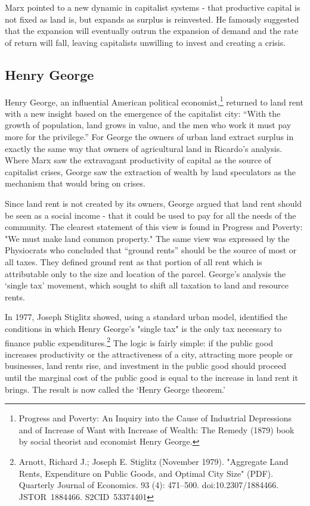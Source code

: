 Marx pointed to a new dynamic in capitalist systems - that productive capital is not fixed as land is, but  expands as surplus is reinvested. He famously suggested that the expansion will eventually outrun the expansion of demand and the rate of return will fall, leaving capitalists unwilling to invest and creating a crisis. 


 
\subsection{Henry George} 
  Henry George, an influential American political economist,\footnote{Progress and Poverty: An Inquiry into the Cause of Industrial Depressions and of Increase of Want with Increase of Wealth: The Remedy (1879) book by social theorist and economist Henry George.}  returned to land rent with a new insight based on the emergence of the capitalist city: ``With the growth of population, land grows in value, and the men who work it must pay more for the privilege.'' For George the owners of urban land extract surplus in exactly the same way that owners of agricultural land in Ricardo's analysis. Where Marx saw  the extravagant productivity of capital  as the source of capitalist crises, George saw the extraction of wealth by land speculators as the mechanism that would bring on crises.
  
  Since land rent is not created by its owners, George argued that land rent should be seen as a social income - that it could be used to pay for all the needs of the community. The clearest statement of this view is found in Progress and Poverty: "We must make land common property." The same view was expressed by the Physiocrats who concluded  that ``ground rents'' should be the source of most or all taxes. They defined ground rent as that portion of all rent which is attributable only to the size and location of the parcel. George's analysis the `single tax' movement, which sought to shift all taxation to land  and resource rents.   
  
  In 1977, Joseph Stiglitz  showed, using a standard urban model, identified the conditions in which Henry George's "single tax" is  the only tax necessary to finance public expenditures.\footnote{Arnott, Richard J.; Joseph E. Stiglitz (November 1979). "Aggregate Land Rents, Expenditure on Public Goods, and Optimal City Size" (PDF). Quarterly Journal of Economics. 93 (4): 471–500. doi:10.2307/1884466. JSTOR 1884466. S2CID 53374401 }   The logic is fairly simple: if the public good increases productivity or the attractiveness of a city, attracting more people or businesses, land rents rise, and investment in the public good should proceed until the marginal cost of the public good is equal to the increase in land rent it brings. The result is now called the `Henry George theorem.'


